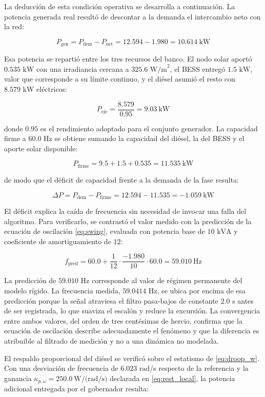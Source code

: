 La deducción de esta condición operativa se desarrolla a continuación. La potencia generada real resultó de descontar a la demanda el intercambio neto con la red:

\[
P_{\text{gen}} = P_{\text{dem}} - P_{\text{net}} = 12.594 - 1.980 = 10.614\ \text{kW}
\]

Esa potencia se repartió entre los tres recursos del banco. El nodo solar aportó $0.535\text{ kW}$ con una irradiancia cercana a $325.6\text{ W/m}^2$, el BESS entregó $1.5\text{ kW}$, valor que corresponde a su límite continuo, y el diésel asumió el resto con $8.579\text{ kW}$ eléctricos:

\[
P_{\text{eje}} = \frac{8.579}{0.95} = 9.03\ \text{kW}
\]

donde $0.95$ es el rendimiento adoptado para el conjunto generador. La capacidad firme a $60.0\text{ Hz}$ se obtiene sumando la capacidad del diésel, la del BESS y el aporte solar disponible:

\[
P_{\text{firme}} = 9.5 + 1.5 + 0.535 = 11.535\ \text{kW}
\]

de modo que el déficit de capacidad frente a la demanda de la fase resulta:

\[
\Delta P = P_{\text{dem}} - P_{\text{firme}} = 12.594 - 11.535 = -1.059\ \text{kW}
\]

El déficit explica la caída de frecuencia sin necesidad de invocar una falla del algoritmo. Para verificarlo, se contrastó el valor medido con la predicción de la ecuación de oscilación \eqref{eq:swing}, evaluada con potencia base de $10\text{ kVA}$ y coeficiente de amortiguamiento de $12$:

\begin{equation}\label{eq:res_swing_pred}
f_{\text{pred}} = 60.0 + \frac{1}{12}\cdot\frac{-1.980}{10}\cdot 60.0 = 59.010\ \text{Hz}
\end{equation}

La predicción de $59.010\text{ Hz}$ corresponde al valor de régimen permanente del modelo rígido. La frecuencia medida, $59.0414\text{ Hz}$, se ubica por encima de esa predicción porque la señal atraviesa el filtro pasa-bajos de constante $2.0\text{ s}$ antes de ser registrada, lo que suaviza el escalón y reduce la excursión. La convergencia entre ambos valores, del orden de tres centésimas de hercio, confirma que la ecuación de oscilación describe adecuadamente el fenómeno y que la diferencia es atribuible al filtrado de medición y no a una dinámica no modelada.

El respaldo proporcional del diésel se verificó sobre el estatismo de \eqref{eq:droop_w}. Con una desviación de frecuencia de $6.023\text{ rad/s}$ respecto de la referencia y la ganancia $\kappa_{p,\omega} = 250.0\ \text{W/(rad/s)}$ declarada en \eqref{eq:rest_local}, la potencia adicional entregada por el gobernador resulta:

